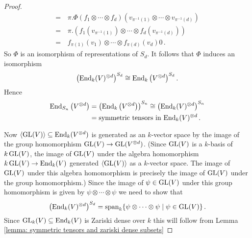 \begin{proof}
\begin{align*}
    =&\,  \pi.\Phi(f_1 \otimes \dotsb \otimes f_d)\left( v_{\pi^{-1}(1)} \otimes \dotsb \otimes v_{\pi^{-1}(d)} \right) \\
    =&\,  \pi.\left( f_1\left(v_{\pi^{-1}(1)}\right) \otimes \dotsb \otimes f_d\left(v_{\pi^{-1}(d)}\right) \right) \\
    =&\,  f_{\pi(1)}(v_1) \otimes \dotsb \otimes f_{\pi(d)}(v_d)0\,.
  \end{align*}
  So $\Phi$ is an isomorphism of representations of $S_d$. It follows that $\Phi$ induces an isomorphism
  \[
          \left( \operatorname{End}_k(V)^{\otimes d} \right)^{S_d}
    \cong \operatorname{End}_k \left(V^{\otimes d}\right)^{S_d}.
  \]
  Hence
  \begin{align*}
          \operatorname{End}_{S_n}\left( V^{\otimes d} \right)
    &=    \left( \operatorname{End}_k\left( V^{\otimes d} \right) \right)^{S_n}
    \cong \left( \operatorname{End}_k(V)^{\otimes d} \right)^{S_n} \\
    &=    \text{symmetric tensors in $\operatorname{End}_k(V)^{\otimes d}$} \,.
  \end{align*}
  
  Now $\left\langle \operatorname{GL}(V) \right\rangle \subseteq \operatorname{End}_k(V^{\otimes d})$ is generated as an $k$-vector space by the image of the group homomorphism $\operatorname{GL}(V) \to \operatorname{GL}(V^{\otimes d})$.
  (Since $\operatorname{GL}(V)$ is a $k$-basis of $k\operatorname{GL}(V)$, the image of $\operatorname{GL}(V)$ under the algebra homomorphism $k \operatorname{GL}(V) \to \operatorname{End}_k(V)$ generated $\left\langle \operatorname{GL}(V) \right\rangle$ as a $k$-vector space.
  The image of $\operatorname{GL}(V)$ under this algebra homomorphism is precisely the image of $\operatorname{GL}(V)$ under the group homomorphism.)
  Since the image of $\psi \in \operatorname{GL}(V)$ under this group homomorphism is given by $\psi \otimes \dotsb \otimes \psi$ we need to show that
  \[
      \left( \operatorname{End}_k(V)^{\otimes d} \right)^{S_d}
    = \operatorname{span}_k  \{
                  \psi \otimes \dotsb \otimes \psi
                \mid
                  \psi \in \operatorname{GL}(V)
                \} \,.
  \]
  Since $\operatorname{GL}_k(V) \subseteq \operatorname{End}_k(V)$ is Zariski dense over $k$ this will follow from Lemma \ref{lemma: symmetric tensors and zariski dense subsets}
\end{proof}


